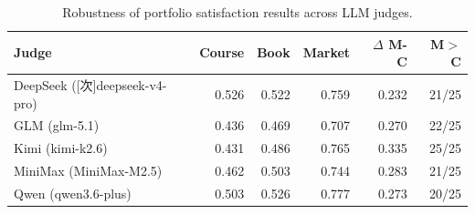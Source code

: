 \begin{table}[t]
\caption{Robustness of portfolio satisfaction results across LLM judges.}
\label{tab:judge-robustness}
\centering
\begin{tabular}{lrrrrr}
\hline
Judge & Course & Book & Market & $\Delta$ M-C & M$>$C \\
\hline
DeepSeek ([次]deepseek-v4-pro) & 0.526 & 0.522 & 0.759 & 0.232 & 21/25 \\
GLM (glm-5.1) & 0.436 & 0.469 & 0.707 & 0.270 & 22/25 \\
Kimi (kimi-k2.6) & 0.431 & 0.486 & 0.765 & 0.335 & 25/25 \\
MiniMax (MiniMax-M2.5) & 0.462 & 0.503 & 0.744 & 0.283 & 21/25 \\
Qwen (qwen3.6-plus) & 0.503 & 0.526 & 0.777 & 0.273 & 20/25 \\
\hline
\end{tabular}
\end{table}
